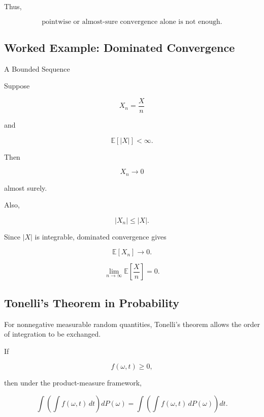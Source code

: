 Thus,

\[
\boxed{
\text{pointwise or almost-sure convergence alone is not enough}.
}
\]

\subsection{Worked Example: Dominated Convergence}
\label{subsec:worked-dct}

\begin{workedexamplebox}{A Bounded Sequence}

Suppose

\[
X_n
=
\frac{X}{n}
\]

and

\[
\mathbb{E}[|X|]<\infty.
\]

Then

\[
X_n\to0
\]

almost surely.

Also,

\[
|X_n|
\leq
|X|.
\]

Since \(|X|\) is integrable, dominated convergence gives

\[
\mathbb{E}[X_n]
\to0.
\]

\begin{answerbox}
\[
\boxed{
\lim_{n\to\infty}
\mathbb{E}
\left[
\frac{X}{n}
\right]
=
0.
}
\]
\end{answerbox}

\end{workedexamplebox}

\subsection{Tonelli's Theorem in Probability}
\label{subsec:tonelli-probability}

For nonnegative measurable random quantities, Tonelli's theorem allows
the order of integration to be exchanged.

If

\[
f(\omega,t)\geq0,
\]

then under the product-measure framework,

\[
\boxed{
\int
\left(
\int f(\omega,t)\,dt
\right)
dP(\omega)
=
\int
\left(
\int f(\omega,t)\,dP(\omega)
\right)
dt.
}
\]

